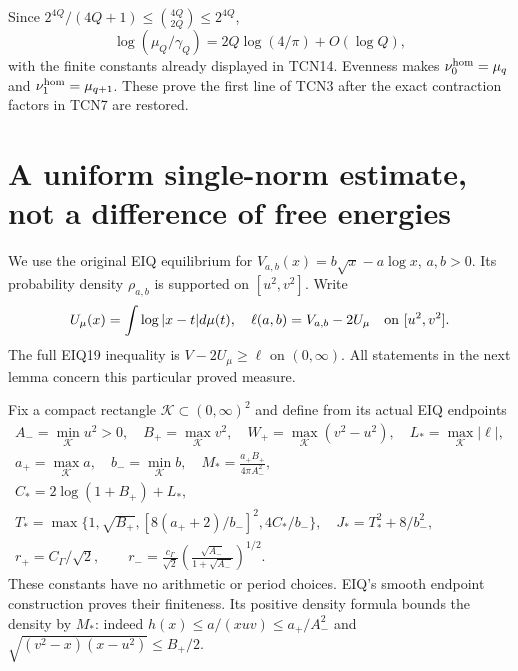 \documentclass[11pt,a4paper]{article}
\begin{document}
Since $2^{4Q}/(4Q+1)\le\binom{4Q}{2Q}\le2^{4Q}$,
\begin{equation}\tag{TCN15}
 \log(\mu_Q/\gamma_Q)=2Q\log(4/\pi)+O(\log Q),
\end{equation}
with the finite constants already displayed in TCN14.
Evenness makes $\nu_0^{\rm hom}=\mu_q$ and
$\nu_1^{\rm hom}=\mu_{q+1}$. These prove the first line of
TCN3 after the exact contraction factors in TCN7 are restored.

\section{A uniform single-norm estimate, not a difference of free energies}

We use the original EIQ equilibrium for
$V_{a,b}(x)=b\sqrt x-a\log x$, $a,b>0$.
Its probability density $\rho_{a,b}$ is supported on $[u^2,v^2]$.
Write
\[
 U_\mu(x)=\int\log|x-t|d\mu(t),\quad
 \ell(a,b)=V_{a,b}-2U_\mu\quad\hbox{on }[u^2,v^2].
\]
The full EIQ19 inequality is $V-2U_\mu\ge\ell$ on $(0,\infty)$.
All statements in the next lemma concern this particular proved measure.

Fix a compact rectangle $\mathscr K\subset(0,\infty)^2$ and define
from its actual EIQ endpoints
\begin{equation}\tag{TCN16}
 \begin{gathered}
 A_- =\min_{\mathscr K}u^2>0,\quad B_+=\max_{\mathscr K}v^2,
 \quad W_+=\max_{\mathscr K}(v^2-u^2),\quad
 L_* =\max_{\mathscr K}|\ell|,\\
 a_+=\max_{\mathscr K}a,\quad b_- =\min_{\mathscr K}b,
 \quad M_* =\frac{a_+B_+}{4\pi A_-^2},\\
 C_* =2\log(1+B_+)+L_*,\\
 T_* =\max\{1,\sqrt{B_+},[8(a_++2)/b_-]^2,4C_*/b_-\},
 \quad J_* =T_*^2+8/b_-^2,\\
 r_+=C_\Gamma/\sqrt2,\qquad
 r_-=\frac{c_\Gamma}{\sqrt2}
         \left(\frac{\sqrt{A_-}}{1+\sqrt{A_-}}\right)^{1/2}.
 \end{gathered}
\end{equation}
These constants have no arithmetic or period choices. EIQ's smooth
endpoint construction proves their finiteness. Its positive density
formula bounds the density by $M_*$: indeed
$h(x)\le a/(xuv)\le a_+/A_-^2$ and
$\sqrt{(v^2-x)(x-u^2)}\le B_+/2$.
\end{document}
